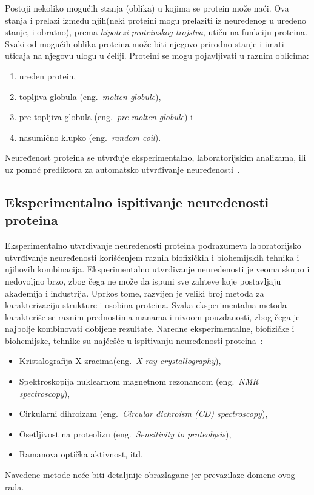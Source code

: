 Postoji nekoliko mogućih stanja (oblika) u kojima se protein može naći. Ova stanja i prelazi između njih(neki proteini mogu prelaziti iz neuređenog u uređeno stanje, i obratno), prema {\em hipotezi proteinskog trojstva}, utiču na funkciju proteina. Svaki od mogućih oblika proteina može biti njegovo prirodno stanje i imati uticaja na njegovu ulogu u ćeliji. Proteini se mogu pojavljivati u raznim oblicima:
\begin{enumerate}
\item uređen protein,
\item topljiva globula (eng.~{\em molten globule}),
\item pre-topljiva globula (eng.~{\em pre-molten globule}) i 
\item nasumično klupko (eng.~{\em random coil}).
\end{enumerate}

Neuređenost proteina se utvrđuje eksperimentalno, laboratorijskim analizama, ili uz pomoć prediktora za automatsko utvrđivanje neuređenosti~\cite{JKd,IDP,IDPIDPr,DPC, IDPiH, BinaryClass}. 

\subsection{Eksperimentalno ispitivanje neuređenosti proteina}
\label{eksperimentalno}
Eksperimentalno utvrđivanje neuređenosti proteina podrazumeva laboratorijsko utvrđivanje neuređenosti korišćenjem raznih biofizičkih i biohemijskih tehnika i njihovih kombinacija. Eksperimentalno utvrđivanje neuređenosti je veoma skupo i nedovoljno brzo, zbog čega ne može da ispuni sve zahteve koje postavljaju akademija i industrija. Uprkos tome, razvijen je veliki broj metoda za karakterizaciju strukture i osobina proteina. Svaka eksperimentalna metoda karakteriše se raznim prednostima manama i nivoom pouzdanosti, zbog čega je najbolje kombinovati dobijene rezultate. Naredne eksperimentalne, biofizičke i biohemijske, tehnike su najčešće u ispitivanju neuređenosti proteina~\cite{JKd, IDP}:
\begin{itemize}
\item Kristalografija X-zracima(eng.~{\em X-ray crystallography}),
\item Spektroskopija nuklearnom magnetnom rezonancom (eng.~{\em NMR spectroscopy}),
\item Cirkularni dihroizam (eng.~{\em Circular dichroism (CD) spectroscopy}),
\item Osetljivost na proteolizu (eng.~{\em Sensitivity to proteolysis}),
\item Ramanova optička aktivnost, itd. 
\end{itemize}
Navedene metode neće biti detaljnije obrazlagane jer prevazilaze domene ovog rada. 

